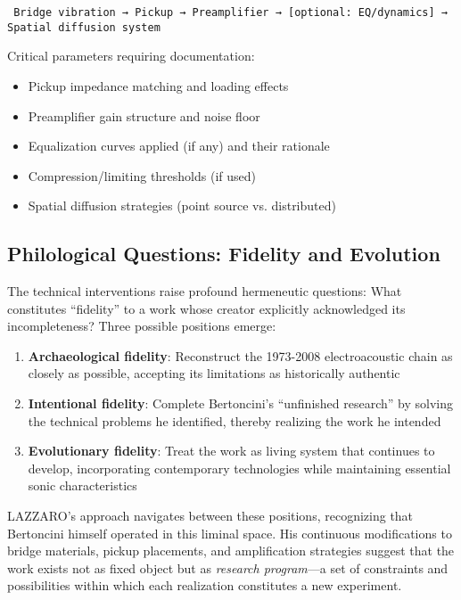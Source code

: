 \texttt{
  Bridge vibration → Pickup → Preamplifier → [optional: EQ/dynamics] → 
  Spatial diffusion system
}

Critical parameters requiring documentation:
\begin{itemize}
  \item Pickup impedance matching and loading effects
  \item Preamplifier gain structure and noise floor
  \item Equalization curves applied (if any) and their rationale
  \item Compression/limiting thresholds (if used)
  \item Spatial diffusion strategies (point source vs. distributed)
\end{itemize}

\subsection{Philological Questions: Fidelity and Evolution}

The technical interventions raise profound hermeneutic questions: What 
constitutes ``fidelity'' to a work whose creator explicitly acknowledged its 
incompleteness? Three possible positions emerge:

\begin{enumerate}
  \item \textbf{Archaeological fidelity}: Reconstruct the 1973-2008 
  electroacoustic chain as closely as possible, accepting its limitations as 
  historically authentic
  \item \textbf{Intentional fidelity}: Complete Bertoncini's ``unfinished 
  research'' by solving the technical problems he identified, thereby realizing 
  the work he intended
  \item \textbf{Evolutionary fidelity}: Treat the work as living system that 
  continues to develop, incorporating contemporary technologies while 
  maintaining essential sonic characteristics
\end{enumerate}

LAZZARO's approach navigates between these positions, recognizing that 
Bertoncini himself operated in this liminal space. His continuous modifications 
to bridge materials, pickup placements, and amplification strategies suggest 
that the work exists not as fixed object but as \emph{research program}---a 
set of constraints and possibilities within which each realization constitutes 
a new experiment.

